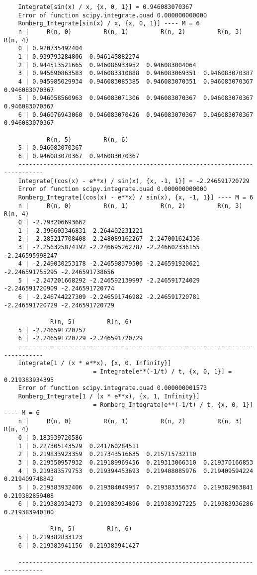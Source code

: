 \documentclass{ctexart}
\begin{document}
\begin{verbatim}
	Integrate[sin(x) / x, {x, 0, 1}] = 0.946083070367 
	Error of function scipy.integrate.quad 0.000000000000
	Romberg_Integrate[sin(x) / x, {x, 0, 1}] ---- M = 6
	n |     R(n, 0)         R(n, 1)         R(n, 2)         R(n, 3)         R(n, 4)
	0 | 0.920735492404 
	1 | 0.939793284806  0.946145882274 
	2 | 0.944513521665  0.946086933952  0.946083004064 
	3 | 0.945690863583  0.946083310888  0.946083069351  0.946083070387 
	4 | 0.945985029934  0.946083085385  0.946083070351  0.946083070367  0.946083070367 
	5 | 0.946058560963  0.946083071306  0.946083070367  0.946083070367  0.946083070367
	6 | 0.946076943060  0.946083070426  0.946083070367  0.946083070367  0.946083070367
	
	        R(n, 5)         R(n, 6)
	5 | 0.946083070367
	6 | 0.946083070367  0.946083070367
	-----------------------------------------------------------------------------
	Integrate[(cos(x) - e**x) / sin(x), {x, -1, 1}] = -2.246591720729 
	Error of function scipy.integrate.quad 0.000000000000
	Romberg_Integrate[(cos(x) - e**x) / sin(x), {x, -1, 1}] ---- M = 6
	n |     R(n, 0)         R(n, 1)         R(n, 2)         R(n, 3)         R(n, 4)
	0 | -2.793206693662
	1 | -2.396603346831 -2.264402231221
	2 | -2.285217708408 -2.248089162267 -2.247001624336
	3 | -2.256325874192 -2.246695262787 -2.246602336155 -2.246595998247
	4 | -2.249030253178 -2.246598379506 -2.246591920621 -2.246591755295 -2.246591738656
	5 | -2.247201668292 -2.246592139997 -2.246591724029 -2.246591720909 -2.246591720774
	6 | -2.246744227309 -2.246591746982 -2.246591720781 -2.246591720729 -2.246591720729
	
	         R(n, 5)         R(n, 6)
	5 | -2.246591720757
	6 | -2.246591720729 -2.246591720729
	-----------------------------------------------------------------------------
	Integrate[1 / (x * e**x), {x, 0, Infinity}]
	                     = Integrate[e**(-1/t) / t, {x, 0, 1}] = 0.219383934395 
	Error of function scipy.integrate.quad 0.000000001573
	Romberg_Integrate[1 / (x * e**x), {x, 1, Infinity}] 
	                     = Romberg_Integrate[e**(-1/t) / t, {x, 0, 1}] ---- M = 6
	n |     R(n, 0)         R(n, 1)         R(n, 2)         R(n, 3)         R(n, 4)  
	0 | 0.183939720586 
	1 | 0.227305143529  0.241760284511 
	2 | 0.219833923359  0.217343516635  0.215715732110 
	3 | 0.219350957932  0.219189969456  0.219313066310  0.219370166853 
	4 | 0.219383579753  0.219394453693  0.219408085976  0.219409594224  0.219409748842 
	5 | 0.219383932406  0.219384049957  0.219383356374  0.219382963841  0.219382859408
	6 | 0.219383934273  0.219383934896  0.219383927225  0.219383936286  0.219383940100
	
	         R(n, 5)         R(n, 6)
	5 | 0.219382833123 
	6 | 0.219383941156  0.219383941427 
	
	-----------------------------------------------------------------------------
	
	
	
\end{verbatim}
\end{document}
